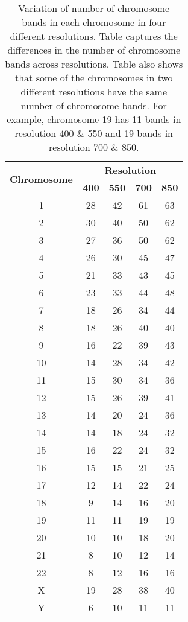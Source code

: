 \begin{table}[h!]
  \centering
  \begin{tabular}{|c|c|c|c|c|}
    \hline
    \multirow{2}{*}{\textbf{Chromosome}} & \multicolumn{4}{|c|}{\textbf{Resolution}} \\ \cline{2-5}   
			&\textbf{400} &\textbf{550} & \textbf{700} & \textbf{850}\\ \hline   
    1& 28 & 42 & 61&63\\ \hline
    2& 30 & 40 &50&62\\ \hline
    3& 27& 36 & 50&62\\ \hline
    4& 26 &30& 45&47\\ \hline
    5& 21& 33& 43&45\\ \hline
    6& 23& 33 &44&48\\ \hline
    7& 18& 26& 34&44\\ \hline
    8& 18&26& 40&40\\ \hline
    9& 16 &22& 39&43\\ \hline
    10& 14 &28 &34&42\\ \hline
    11& 15 &30& 34&36\\ \hline
    12& 15 & 26 &39&41\\ \hline
    13& 14& 20 & 24&36\\ \hline
    14& 14 &18& 24&32\\ \hline
    15& 16 & 22& 24&32\\ \hline
    16& 15& 15 &21&25\\ \hline
    17& 12& 14& 22&24\\ \hline
    18& 9 &14& 16&20\\ \hline
    19& 11&11& 19&19\\ \hline
    20& 10& 10& 18&20\\ \hline 
    21& 8 & 10& 12&14\\ \hline
    22& 8 & 12 &16&16\\ \hline
    X& 19& 28& 38&40\\ \hline
    Y& 6 &10& 11&11\\ \hline
   \end{tabular}
  \caption[Variation of number of chromosome bands]{Variation of number of chromosome bands in each chromosome in four different resolutions. Table captures the differences in the number of chromosome bands across resolutions. Table also shows that some of the chromosomes in two different resolutions have the same number of chromosome bands. For example, chromosome 19 has 11 bands in resolution 400 \& 550 and 19 bands in resolution 700 \& 850.}\label{Tab:chrsub}
\end{table}

